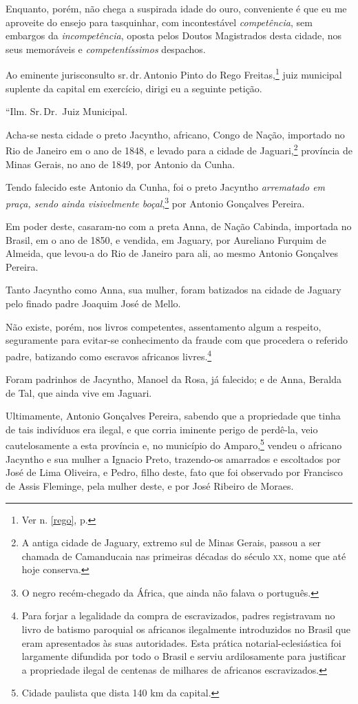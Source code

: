 Enquanto, porém, não chega a suspirada idade do ouro, conveniente é que
eu me aproveite do ensejo para tasquinhar, com incontestável
\emph{competência}, sem embargos da \emph{incompetência}, oposta pelos
Doutos Magistrados desta cidade, nos seus memoráveis e
\emph{competentíssimos} despachos.

Ao eminente jurisconsulto sr.\,dr.\,Antonio Pinto do Rego
Freitas,\footnote{Ver n. \ref{rego}, p. \pageref{rego}}
juiz municipal suplente da capital em exercício, dirigi 
eu a seguinte petição.

``Ilm. Sr.\,Dr.~Juiz Municipal.

Acha-se nesta cidade o preto Jacyntho, africano, Congo de Nação,
importado no Rio de Janeiro em o ano de 1848, e levado para a cidade de
Jaguari,\footnote{A antiga cidade de Jaguary, extremo sul de Minas
  Gerais, passou a ser chamada de Camanducaia nas primeiras décadas do
  século \textsc{xx}, nome que até hoje conserva.} província de Minas Gerais, no
ano de 1849, por Antonio da Cunha.

Tendo falecido este Antonio da Cunha, foi o preto Jacyntho
\emph{arrematado em praça, sendo ainda visivelmente boçal},\footnote{O
  negro recém-chegado da África, que ainda não falava o português.} por
Antonio Gonçalves Pereira.

Em poder deste, casaram-no com a preta Anna, de Nação Cabinda, importada
no Brasil, em o ano de 1850, e vendida, em Jaguary, por Aureliano
Furquim de Almeida, que levou-a do Rio de Janeiro para ali, ao mesmo
Antonio Gonçalves Pereira.

Tanto Jacyntho como Anna, sua mulher, foram batizados na cidade de
Jaguary pelo finado padre Joaquim José de Mello.

Não existe, porém, nos livros competentes, assentamento algum a
respeito, seguramente para evitar-se conhecimento da fraude com que
procedera o referido padre, batizando como escravos africanos
livres.\footnote{Para forjar a legalidade da compra de escravizados,
  padres registravam no livro de batismo paroquial os africanos
  ilegalmente introduzidos no Brasil que eram apresentados às suas
  autoridades. Esta prática notarial-eclesiástica foi largamente
  difundida por todo o Brasil e serviu ardilosamente para justificar a
  propriedade ilegal de centenas de milhares de africanos escravizados.}

Foram padrinhos de Jacyntho, Manoel da Rosa, já falecido; e de Anna,
Beralda de Tal, que ainda vive em Jaguari.

Ultimamente, Antonio Gonçalves Pereira, sabendo que a propriedade que
tinha de tais indivíduos era ilegal, e que corria iminente perigo de
perdê-la, veio cautelosamente a esta província e, no município do
Amparo,\footnote{Cidade paulista que dista 140 km da capital.} vendeu
o africano Jacyntho e sua mulher a Ignacio Preto, trazendo-os amarrados
e escoltados por José de Lima Oliveira, e Pedro, filho deste, fato que
foi observado por Francisco de Assis Fleminge, pela mulher deste, e por
José Ribeiro de Moraes.

